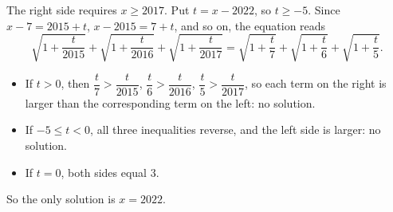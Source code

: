 The right side requires $x\ge2017$. Put $t=x-2022$, so $t\ge-5$. Since $x-7=2015+t$, $x-2015=7+t$, and so on, the equation reads
\[
\sqrt{1+\dfrac{t}{2015}}+\sqrt{1+\dfrac{t}{2016}}+\sqrt{1+\dfrac{t}{2017}}=\sqrt{1+\dfrac {t}{7}}+\sqrt{1+\dfrac {t}{6}}+\sqrt{1+\dfrac {t}{5}}.
\]
\begin{itemize}
\item If $t>0$, then $\dfrac {t}{7}>\dfrac {t}{2015}$, $\dfrac {t}{6}>\dfrac {t}{2016}$, $\dfrac {t}{5}>\dfrac {t}{2017}$, so each term on the right is larger than the corresponding term on the left: no solution.
\item If $-5\le t<0$, all three inequalities reverse, and the left side is larger: no solution.
\item If $t=0$, both sides equal $3$.
\end{itemize}
So the only solution is $\boxed{x=2022}$.
